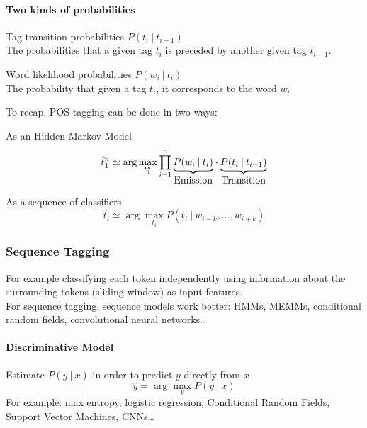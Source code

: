 \documentclass[10pt]{report}
\begin{document}
\paragraph{Two kinds of probabilities}
\begin{list}{}{}
	\item Tag transition probabilities $P(t_i\:|\:t_{i-1})$\\
	The probabilities that a given tag $t_i$ is preceded by another given tag $t_{i-1}$.
	\item Word likelihood probabilities $P(w_i\:|\:t_i)$\\
	The probability that given a tag $t_i$, it corresponds to the word $w_i$
\end{list}
To recap, POS tagging can be done in two ways:
\begin{list}{}{}
	\item As an Hidden Markov Model $$\hat{t}_1^n \simeq \arg\max_{t_1^n}\prod_{i=1}^n\underset{\hbox{Emission}}{\underbrace{P(w_i\:|\:t_i)}}\cdot \underset{\hbox{Transition}}{\underbrace{P(t_i\:|\:t_{i-1})}}$$ 
	\item As a sequence of classifiers $$\hat{t}_i \simeq \arg\max_{t_i}P(t_i\:|\:w_{i-k},\ldots,w_{i+k})$$
\end{list}
\subsubsection{Sequence Tagging} For example classifying each token independently using information about the surrounding tokens (sliding window) as input features.\\
For sequence tagging, sequence models work better: HMMs, MEMMs, conditional random fields, convolutional neural networks\ldots
\paragraph{Discriminative Model} Estimate $P(y\:|\:x)$ in order to predict $y$ directly from $x$
$$\hat{y}=\arg\max_y P(y\:|\:x)$$
For example: max entropy, logistic regression, Conditional Random Fields, Support Vector Machines, CNNs\ldots
\end{document}
